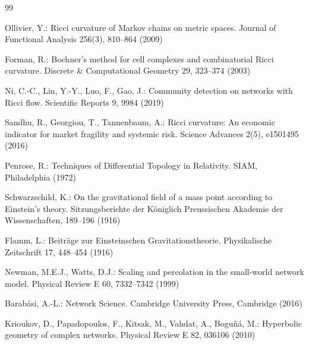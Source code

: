 \documentclass{svproc}
\begin{document}
\begingroup
{}
\begin{thebibliography}{99}

Ollivier, Y.: Ricci curvature of Markov chains on metric spaces. Journal of Functional Analysis 256(3), 810--864 (2009)

Forman, R.: Bochner's method for cell complexes and combinatorial Ricci curvature. Discrete \& Computational Geometry 29, 323--374 (2003)

Ni, C.-C., Lin, Y.-Y., Luo, F., Gao, J.: Community detection on networks with Ricci flow. Scientific Reports 9, 9984 (2019)

Sandhu, R., Georgiou, T., Tannenbaum, A.: Ricci curvature: An economic indicator for market fragility and systemic risk. Science Advances 2(5), e1501495 (2016)

Penrose, R.: Techniques of Differential Topology in Relativity. SIAM, Philadelphia (1972)

Schwarzschild, K.: On the gravitational field of a mass point according to Einstein's theory. Sitzungsberichte der K\"oniglich Preussischen Akademie der Wissenschaften, 189--196 (1916)

Flamm, L.: Beitr\"age zur Einsteinschen Gravitationstheorie. Physikalische Zeitschrift 17, 448--454 (1916)

Newman, M.E.J., Watts, D.J.: Scaling and percolation in the small-world network model. Physical Review E 60, 7332--7342 (1999)

Barab\'asi, A.-L.: Network Science. Cambridge University Press, Cambridge (2016)

Krioukov, D., Papadopoulos, F., Kitsak, M., Vahdat, A., Bogu\~n\'a, M.: Hyperbolic geometry of complex networks. Physical Review E 82, 036106 (2010)

\end{thebibliography}
\endgroup
\end{document}
